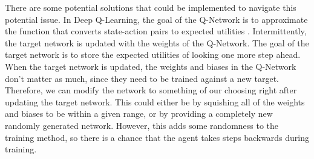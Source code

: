 \documentclass[12pt]{article}
\begin{document}
There are some potential solutions that could be implemented to navigate this potential issue.
In Deep Q-Learning, the goal of the Q-Network is to approximate the function that converts state-action pairs to expected utilities \cite{article_reinforcement_learning_survey}.
Intermittently, the target network is updated with the weights of the Q-Network.
The goal of the target network is to store the expected utilities of looking one more step ahead.
When the target network is updated, the weights and biases in the Q-Network don't matter as much, since they need to be trained against a new target.
Therefore, we can modify the network to something of our choosing right after updating the target network.
This could either be by squishing all of the weights and biases to be within a given range, or by providing a completely new randomly generated network.
However, this adds some randomness to the training method, so there is a chance that the agent takes steps backwards during training.

\newpage


\end{document}
